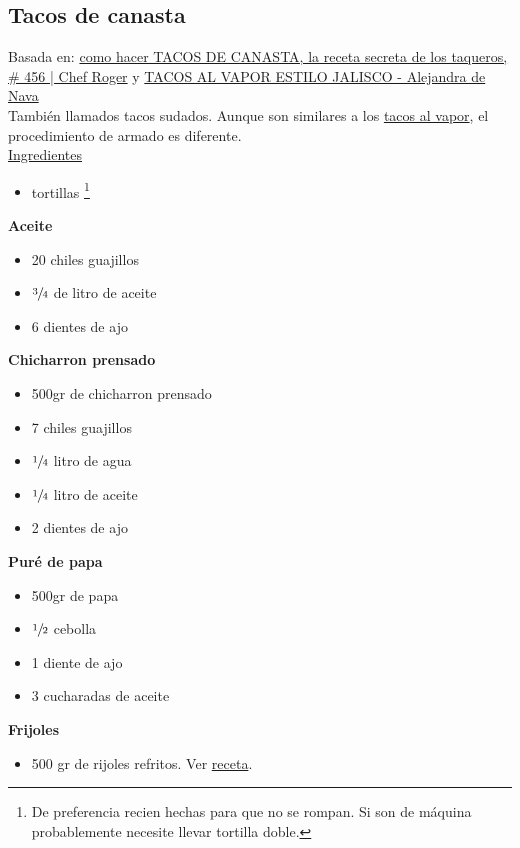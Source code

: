 \subsection{Tacos de canasta}
\label{sec:tacos-de-canasta}

Basada en: \href{https://www.youtube.com/watch?v=kH0nLhOtY2s}{como hacer TACOS DE CANASTA, la receta secreta de los taqueros, \# 456 | Chef Roger} y \href{https://www.youtube.com/watch?v=PoDRiJ3zVmc}{TACOS AL VAPOR ESTILO JALISCO - Alejandra de Nava}\\

También llamados tacos sudados. Aunque son similares a los \hyperref[sec:tacos-al-vapor]{tacos al vapor}, el procedimiento de armado es diferente.\\

\underline{Ingredientes} 

\begin{itemize}
\item {} tortillas \footnote{De preferencia recien hechas para que no se rompan. Si son de máquina probablemente necesite llevar tortilla doble.}
\end{itemize}

\textbf{Aceite}
\begin{itemize}
\item 20 chiles guajillos
\item $\sfrac{3}{4}$ de litro de aceite
\item 6 dientes de ajo
\end{itemize}

\textbf{Chicharron prensado}
\begin{itemize}
\item 500gr de chicharron prensado
\item 7 chiles guajillos
\item $\sfrac{1}{4}$ litro de agua
\item $\sfrac{1}{4}$ litro de aceite
\item 2 dientes de ajo
\end{itemize}

\textbf{Puré de papa}
\begin{itemize}
\item 500gr de papa
\item $\sfrac{1}{2}$ cebolla
\item 1 diente de ajo
\item 3 cucharadas de aceite
\end{itemize}

\textbf{Frijoles}
\begin{itemize}
\item 500 gr de rijoles refritos. Ver \href{sec:frijoles-refritos}{receta}.
\end{itemize}

